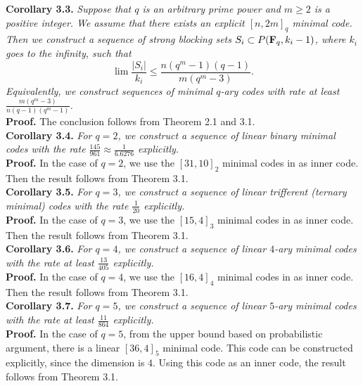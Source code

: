 \documentclass[12pt]{article}
\begin{document}
{\bf Corollary 3.3.} {\em Suppose that $q$ is an arbitrary prime power and $m \geq 2$ is a positive integer. We assume that there exists an explicit $[n,2m]_q$ minimal code. Then we construct a sequence of strong blocking sets $S_i \subset P({\bf F}_q, k_i-1)$, where $k_i$ goes to the infinity,  such that $$\lim \frac{|S_i|}{k_i}\leq \frac{n(q^m-1)(q-1)}{m(q^m-3)}.$$ Equivalently, we construct sequences of minimal $q$-ary codes with rate at least $\frac{m(q^m-3)}{n(q-1)(q^m-1)}$.}\\

{\bf Proof.} The conclusion follows from Theorem 2.1 and 3.1.\\

{\bf Corollary 3.4.} {\em For $q=2$, we construct a sequence of linear binary minimal codes with the rate $\frac{145}{961} \approx \frac{1}{6.6276}$ explicitly.}\\

{\bf Proof.} In the case of $q=2$, we use the $[31,10]_2$ minimal codes in \cite[Table 1]{Kurz} as inner code. Then the result follows from Theorem 3.1.\\




{\bf Corollary 3.5.} {\em For $q=3$, we construct a sequence of linear trifferent (ternary minimal) codes with the rate $\frac{1}{20}$ explicitly.}\\


{\bf Proof.} In the case of $q=3$, we use the $[15,4]_3$ minimal codes in \cite[Page 11]{Kurz} as inner code. Then the result follows from Theorem 3.1.\\





{\bf Corollary 3.6.} {\em For $q=4$, we construct a sequence of linear $4$-ary minimal codes with the rate at least $\frac{13}{405}$ explicitly.}\\

{\bf Proof.} In the case of $q=4$, we use the $[16,4]_4$ minimal codes in \cite[Table 1]{Kurz} as inner code. Then the result follows from Theorem 3.1.\\



{\bf Corollary 3.7.} {\em For $q=5$, we construct a sequence of linear $5$-ary minimal codes with the rate at least $\frac{11}{864}$ explicitly.}\\

{\bf Proof.} In the case of $q=5$, from the upper bound based on probabilistic argument, there is a linear $[36,4]_5$ minimal code. This code can be constructed explicitly, since the dimension is $4$. Using this code as an inner code, the result follows from Theorem 3.1.\\
\end{document}
